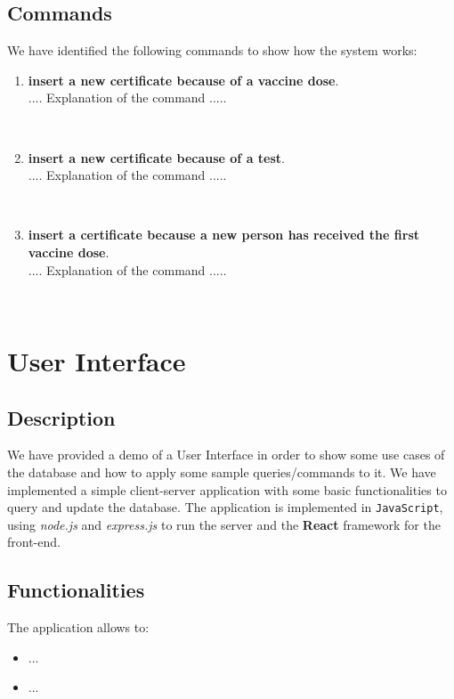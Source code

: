 \documentclass{article}
\begin{document}
\subsection{Commands}
We have identified the following commands to show how the system works:\\
\begin{enumerate}
    \item \textbf{insert a new certificate because of a vaccine dose}.\\ .... Explanation of the command .....
    \begin{lstlisting}
    
    \end{lstlisting}
    \item \textbf{insert a new certificate because of a test}.\\ .... Explanation of the command .....
    \begin{lstlisting}
    
    \end{lstlisting}
    \item \textbf{insert a certificate because a new person has received the first vaccine dose}.\\ .... Explanation of the command .....
    \begin{lstlisting}
    
    \end{lstlisting}
\end{enumerate}
\section{User Interface}
    \subsection{Description}
    We have provided a demo of a User Interface in order to show some use cases of the database and how to apply some sample queries/commands to it. We have implemented a simple client-server application with some basic functionalities to query and update the database. The application is implemented in \verb|JavaScript|, using \textit{node.js} and \textit{express.js} to run the server and the \textbf{React} framework for the front-end.
    \subsection{Functionalities}
    The application allows to:
    \begin{itemize}
    \item ...
    \item ...
    \end{itemize}
\end{document}
